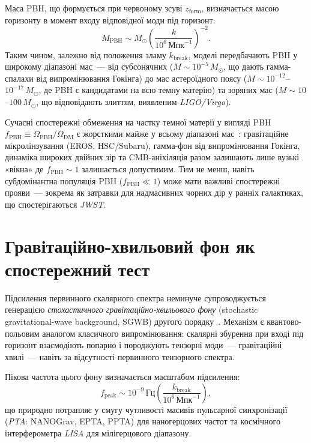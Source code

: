 Маса PBH, що формується при червоному зсуві $z_\mathrm{form}$, визначається масою горизонту в момент входу відповідної моди під горизонт:
\begin{equation}
  M_\mathrm{PBH} \sim M_\odot \left(\frac{k}{10^6\,\text{Мпк}^{-1}}\right)^{-2}.
\end{equation}
Таким чином, залежно від положення зламу $k_\mathrm{break}$, моделі передбачають PBH у широкому діапазоні мас~--- від субсонячних ($M \sim 10^{-5}\,M_\odot$, що дають гамма-спалахи від випромінювання Гокінга) до мас астероїдного поясу ($M \sim 10^{-12}$--$10^{-17}\,M_\odot$, де PBH є кандидатами на всю темну матерію) та зоряних мас ($M \sim 10$--$100\,M_\odot$, що відповідають злиттям, виявленим \emph{LIGO/Virgo}).

Сучасні спостережні обмеження на частку темної матерії у вигляді PBH $f_\mathrm{PBH} \equiv \Omega_\mathrm{PBH}/\Omega_\mathrm{DM}$ є жорсткими майже у всьому діапазоні мас~\cite{Carr2021}: гравітаційне мікролінзування (EROS, HSC/Subaru), гамма-фон від випромінювання Гокінга, динаміка широких двійних зір та CMB-аніхіляція разом залишають лише вузькі «вікна» де $f_\mathrm{PBH} \sim 1$ залишається допустимим. Тим не менш, навіть субдомінантна популяція PBH ($f_\mathrm{PBH} \ll 1$) може мати важливі спостережні прояви~--- зокрема як затравки для надмасивних чорних дір у ранніх галактиках, що спостерігаються \emph{JWST}.

\section{Гравітаційно-хвильовий фон як спостережний тест}
\label{sec:sgwb}

Підсилення первинного скалярного спектра неминуче супроводжується генерацією \emph{стохастичного гравітаційно-хвильового фону} (stochastic gra\-vita\-ti\-onal-wave background, SGWB) другого порядку~\cite{Kohri2018}. Механізм є квантово-польовим аналогом класичного випромінювання: скалярні збурення при вході під горизонт взаємодіють попарно і породжують тензорні моди~--- гравітаційні хвилі~--- навіть за відсутності первинного тензорного спектра.

Пікова частота цього фону визначається масштабом підсилення:
\begin{equation}
  f_\mathrm{peak} \sim 10^{-9}\,\text{Гц}
  \left(\frac{k_\mathrm{break}}{10^6\,\text{Мпк}^{-1}}\right),
\end{equation}
що природно потрапляє у смугу чутливості масивів пульсарної синхронізації (\emph{PTA}: NANOGrav, EPTA, PPTA) для наногерцових частот та космічного інтерферометра \emph{LISA} для мілігерцового діапазону.

